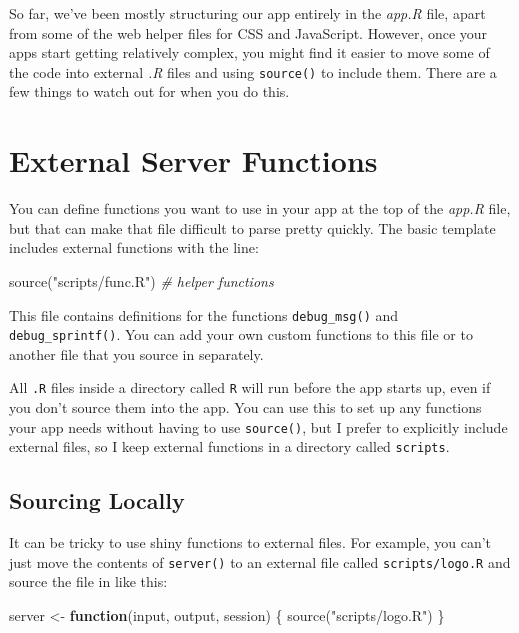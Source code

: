\documentclass[
]{book}
\newenvironment{Shaded}{\begin{snugshade}}{\end{snugshade}}
\newcommand{\CommentTok}[1]{\textcolor[rgb]{0.56,0.35,0.01}{\textit{#1}}}
\newcommand{\ControlFlowTok}[1]{\textcolor[rgb]{0.13,0.29,0.53}{\textbf{#1}}}
\newcommand{\FunctionTok}[1]{\textcolor[rgb]{0.00,0.00,0.00}{#1}}
\newcommand{\NormalTok}[1]{#1}
\newcommand{\OtherTok}[1]{\textcolor[rgb]{0.56,0.35,0.01}{#1}}
\newcommand{\StringTok}[1]{\textcolor[rgb]{0.31,0.60,0.02}{#1}}
\begin{document}
So far, we've been mostly structuring our app entirely in the \emph{app.R} file, apart from some of the web helper files for CSS and JavaScript. However, once your apps start getting relatively complex, you might find it easier to move some of the code into external \emph{.R} files and using \texttt{source()} to include them. There are a few things to watch out for when you do this.

\hypertarget{external-server-functions}{%
\section{External Server Functions}\label{external-server-functions}}

You can define functions you want to use in your app at the top of the \emph{app.R} file, but that can make that file difficult to parse pretty quickly. The basic template includes external functions with the line:

\begin{Shaded}
\begin{Highlighting}[]
\FunctionTok{source}\NormalTok{(}\StringTok{"scripts/func.R"}\NormalTok{) }\CommentTok{\# helper functions}
\end{Highlighting}
\end{Shaded}

This file contains definitions for the functions \texttt{debug\_msg()} and \texttt{debug\_sprintf()}. You can add your own custom functions to this file or to another file that you source in separately.

All \texttt{.R} files inside a directory called \texttt{R} will run before the app starts up, even if you don't source them into the app. You can use this to set up any functions your app needs without having to use \texttt{source()}, but I prefer to explicitly include external files, so I keep external functions in a directory called \texttt{scripts}.

\hypertarget{sourcing-locally}{%
\subsection{Sourcing Locally}\label{sourcing-locally}}

It can be tricky to use shiny functions to external files. For example, you can't just move the contents of \texttt{server()} to an external file called \texttt{scripts/logo.R} and source the file in like this:

\begin{Shaded}
\begin{Highlighting}[]
\NormalTok{server }\OtherTok{\textless{}{-}} \ControlFlowTok{function}\NormalTok{(input, output, session) \{}
    \FunctionTok{source}\NormalTok{(}\StringTok{"scripts/logo.R"}\NormalTok{)}
\NormalTok{\} }
\end{Highlighting}
\end{Shaded}
\end{document}

